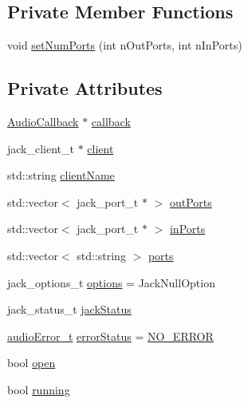 \subsection*{Private Member Functions}
\begin{DoxyCompactItemize}
\item 
void \hyperlink{classdrumpi_1_1audio_1_1JackClient_abb2363379d125b17299d49def97c289d}{set\+Num\+Ports} (int n\+Out\+Ports, int n\+In\+Ports)
\end{DoxyCompactItemize}
\subsection*{Private Attributes}
\begin{DoxyCompactItemize}
\item 
\hyperlink{classdrumpi_1_1audio_1_1AudioCallback}{Audio\+Callback} $\ast$ \hyperlink{classdrumpi_1_1audio_1_1JackClient_a607ea3c9f3b94f006db0abbf6382d6ac}{callback}
\item 
jack\+\_\+client\+\_\+t $\ast$ \hyperlink{classdrumpi_1_1audio_1_1JackClient_a7c7d354192fdfd02dff7ba19db35b055}{client}
\item 
std\+::string \hyperlink{classdrumpi_1_1audio_1_1JackClient_a8b43d4d05f5afaeb3104b0b7f325688c}{client\+Name}
\item 
std\+::vector$<$ jack\+\_\+port\+\_\+t $\ast$ $>$ \hyperlink{classdrumpi_1_1audio_1_1JackClient_a0257d5ed9aa2ad4a9c25776fa474f31e}{out\+Ports}
\item 
std\+::vector$<$ jack\+\_\+port\+\_\+t $\ast$ $>$ \hyperlink{classdrumpi_1_1audio_1_1JackClient_ac04a03af355ac3c7dd117ba8173b8d7a}{in\+Ports}
\item 
std\+::vector$<$ std\+::string $>$ \hyperlink{classdrumpi_1_1audio_1_1JackClient_ab90e744f9193a55d6543d117e9b6c00e}{ports}
\item 
jack\+\_\+options\+\_\+t \hyperlink{classdrumpi_1_1audio_1_1JackClient_ad2d5b25f8eceaad004f6f7058ec8e5b6}{options} = Jack\+Null\+Option
\item 
jack\+\_\+status\+\_\+t \hyperlink{classdrumpi_1_1audio_1_1JackClient_ae875ca9f70638eeb0ff80195634cb64b}{jack\+Status}
\item 
\hyperlink{namespacedrumpi_1_1audio_ac19e3be3b59052606a02605a7ee26f05}{audio\+Error\+\_\+t} \hyperlink{classdrumpi_1_1audio_1_1JackClient_a2bb52401891e1f4b9b74a5f347834f31}{error\+Status} = \hyperlink{namespacedrumpi_1_1audio_af36111ce9632c39e5acb2c811f228e2fa862613743b5354dc75cfa084840a7c0c}{N\+O\+\_\+\+E\+R\+R\+OR}
\item 
bool \hyperlink{classdrumpi_1_1audio_1_1JackClient_a827cedc289fc71939b040d757d15c65e}{open}
\item 
bool \hyperlink{classdrumpi_1_1audio_1_1JackClient_a087d17af8f6e68f1f609f3c276019a8e}{running}
\end{DoxyCompactItemize}
